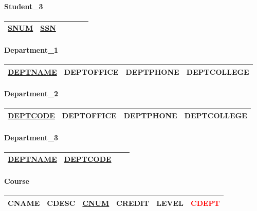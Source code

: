 \documentclass[12pt]{article}
\begin{document}
			\paragraph{Student\_3\\}
				\footnotesize{
					\begin{tabular}{| c | c | c | c | c | c |}
						\hline
						\underline{SNUM} & \underline{SSN}\\
						\hline
					\end{tabular}
				}

			\paragraph{Department\_1\\}
				\footnotesize{
					\begin{tabular}{| c | c | c | c |}
						\hline
						\underline{DEPTNAME} & DEPTOFFICE & DEPTPHONE & DEPTCOLLEGE\\
						\hline
					\end{tabular}
				}

			\paragraph{Department\_2\\}
				\footnotesize{
					\begin{tabular}{| c | c | c | c |}
						\hline
						\underline{DEPTCODE} & DEPTOFFICE & DEPTPHONE & DEPTCOLLEGE\\
						\hline
					\end{tabular}
				}

			\paragraph{Department\_3\\}
				\footnotesize{
					\begin{tabular}{| c | c | c | c |}
						\hline
						\underline{DEPTNAME} & \underline{DEPTCODE}\\
						\hline
					\end{tabular}
				}

			\paragraph{Course\\}
				\footnotesize{
					\begin{tabular}{| c | c | c | c | c | c |}
						\hline
						CNAME & CDESC & \underline{CNUM} & CREDIT & LEVEL & \textcolor{red}{CDEPT}\\
						\hline
					\end{tabular}
				}
\end{document}
